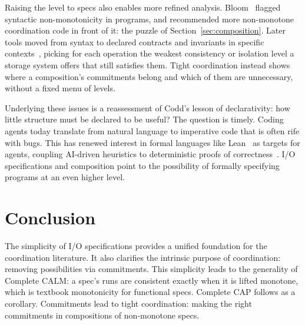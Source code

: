 \documentclass[sigconf]{cidr-2027}
\theoremstyle{remark}
\newcommand{\commitments}{commitments\xspace}
\newcommand{\Commitments}{Commitments\xspace}
\newcommand{\spectype}[1][]{I/O specification#1\xspace}
\begin{document}

Raising the level to specs also enables more refined analysis.
Bloom~\cite{alvaro2011bloom} flagged syntactic non-monotonicity in programs,
and recommended more non-monotone coordination code in front of it: the puzzle of
Section~\ref{sec:composition}. Later tools moved from syntax to declared
contracts and invariants in specific
contexts~\cite{sivaramakrishnan2015quelea,kaki2018alone}, picking for each
operation the weakest consistency or isolation level a storage system offers that still
satisfies them. Tight coordination instead shows where a composition's \commitments belong and which of them are unnecessary, without a fixed menu of levels.

Underlying these issues is a reassessment of Codd's lesson of declarativity: how
little structure must be declared to be
useful? The question is timely. Coding agents today translate from natural
language to imperative code that is often rife with bugs. This has renewed
interest in formal languages like
Lean~\cite{demoura2021lean4} as targets for agents,
coupling AI-driven heuristics to deterministic proofs of
correctness~\cite{hellerstein2023codd,an2025neurosymbolic}.
\spectype[s] and composition point to the possibility of
formally specifying programs at an even higher level.

\section{Conclusion}
\label{sec:conclusion}

The simplicity of \spectype[s] provides a unified foundation for the
coordination literature. It also clarifies the intrinsic purpose of
coordination: removing possibilities via \commitments. This simplicity
leads to the generality of Complete CALM: a spec's runs are consistent exactly
when it is lifted monotone, which is textbook monotonicity for
functional specs. Complete CAP follows as a corollary. \Commitments
lead to tight coordination: making the right commitments in compositions of non-monotone specs.
\end{document}
